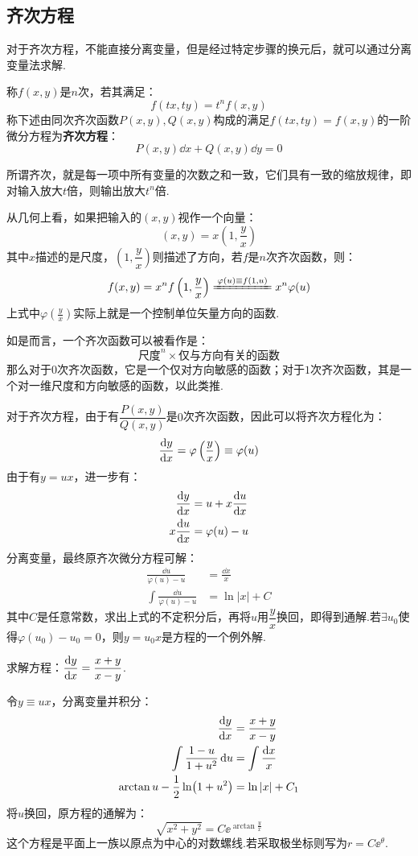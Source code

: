 \subsection{齐次方程}
对于齐次方程，不能直接分离变量，但是经过特定步骤的换元后，就可以通过分离变量法求解.

\begin{definition}
    称$f(x,y)$是$n$次，若其满足：
    \[f(tx,ty) = t^n f(x,y)\]
    称下述由同次齐次函数$P(x,y),Q(x,y)$构成的满足$f(tx,ty)=f(x,y)$的一阶微分方程为\textbf{齐次方程}：
    \[P(x,y)\dd{x} + Q(x,y)\dd{y} = 0\]
\end{definition}

所谓齐次，就是每一项中所有变量的次数之和一致，它们具有一致的缩放规律，即对输入放大$t$倍，则输出放大$t^n$倍.

从几何上看，如果把输入的$(x,y)$视作一个向量：
\[(x,y) = x \left(1,\frac{y}{x}\right)\]
其中$x$描述的是尺度，$\left(1,\dfrac{y}{x}\right)$则描述了方向，若$f$是$n$次齐次函数，则：
\[f(x,y) = x^n f\left(1,\frac{y}{x}\right) \xlongequal{\varphi(u)\equiv f(1,u)} x^n \varphi(u)\]
上式中$\varphi\left(\frac{y}{x}\right)$实际上就是一个控制单位矢量方向的函数.

如是而言，一个齐次函数可以被看作是：
\[\text{尺度}^n \times \text{仅与方向有关的函数}\]
那么对于$0$次齐次函数，它是一个仅对方向敏感的函数；对于$1$次齐次函数，其是一个对一维尺度和方向敏感的函数，以此类推.

对于齐次方程，由于有$\dfrac{P(x,y)}{Q(x,y)}$是$0$次齐次函数，因此可以将齐次方程化为：
\[\dv{y}{x} = \varphi\left(\frac{y}{x}\right) \equiv \varphi(u)\]
由于有$y = ux$，进一步有：
\begin{align*}
    \dv{y}{x} &= u + x\dv{u}{x}\\
    x\dv{u}{x} &= \varphi(u) - u
\end{align*}
分离变量，最终原齐次微分方程可解：
\begin{align*}
    \frac{\dd{u}}{\varphi(u) - u} &= \frac{\dd{x}}{x}\\
    \int\frac{\dd{u}}{\varphi(u) - u} &= \ln|x| + C
\end{align*}
其中$C$是任意常数，求出上式的不定积分后，再将$u$用$\dfrac{y}{x}$换回，即得到通解.若$\exists u_0$使得$\varphi(u_0)-u_0=0$，则$y=u_0 x$是方程的一个例外解.

\begin{question}
    求解方程：$\displaystyle\dv{y}{x} = \frac{x+y}{x-y}$.
\end{question}

\begin{solution}
    令$y \equiv ux$，分离变量并积分：
    \begin{align*}
        \dv{y}{x} &= \frac{x+y}{x-y}\\
        \int\frac{1-u}{1+u^2}\dd{u} &= \int\frac{\dd{x}}{x}\\
        \arctan u - \frac{1}{2}\ln(1+u^2) &= \ln|x| + C_1
    \end{align*}
    将$u$换回，原方程的通解为：
    \[\sqrt{x^2+y^2} = C \ee^{\arctan\frac{y}{x}}\]
    这个方程是平面上一族以原点为中心的对数螺线.若采取极坐标则写为$r = C\ee^\theta$.
\end{solution}

